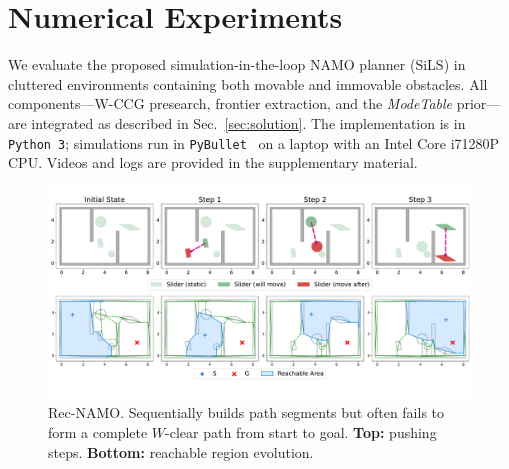 \section{Numerical Experiments}
\label{sec:experiments}
We evaluate the proposed simulation-in-the-loop NAMO planner (SiLS) 
in cluttered environments containing both movable 
and immovable obstacles. All components—W-CCG presearch, frontier extraction, 
and the \textit{ModeTable} prior—are integrated as described in Sec.~\ref{sec:solution}. 
The implementation is in \texttt{Python~3}; 
simulations run in \texttt{PyBullet}~\cite{coumans2019} on a laptop with an Intel Core i7\textendash1280P CPU. 
Videos and logs are provided in the supplementary material.

\begin{figure}[t!]
  \centering
  \vspace{-3mm}
  \includegraphics[width=0.95\columnwidth]{figures/Rec_NAMO.pdf}
  \vspace{-10mm}
  \caption{Rec-NAMO. Sequentially builds path segments but often fails to form a complete $W$-clear path from start to goal. \textbf{Top:} pushing steps. \textbf{Bottom:} reachable region evolution.}
  \vspace{-6mm}
  \label{fig:Rec-NAMO}
\end{figure}


